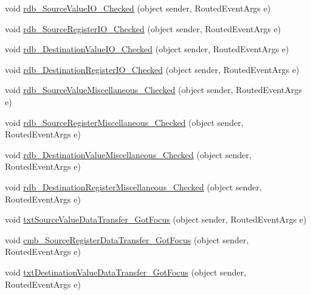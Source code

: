 \begin{DoxyCompactItemize}
\item 
void \hyperlink{class_c_p_u___o_s___simulator_1_1_instructions_window_aa84c68252386686704bfc50fc0013377}{rdb\+\_\+\+Source\+Value\+I\+O\+\_\+\+Checked} (object sender, Routed\+Event\+Args e)
\item 
void \hyperlink{class_c_p_u___o_s___simulator_1_1_instructions_window_a2bb662bda02027f69c3ac5eda1131bb5}{rdb\+\_\+\+Source\+Register\+I\+O\+\_\+\+Checked} (object sender, Routed\+Event\+Args e)
\item 
void \hyperlink{class_c_p_u___o_s___simulator_1_1_instructions_window_a6b3d3a23e92def88a459a22d3b020cf7}{rdb\+\_\+\+Destination\+Value\+I\+O\+\_\+\+Checked} (object sender, Routed\+Event\+Args e)
\item 
void \hyperlink{class_c_p_u___o_s___simulator_1_1_instructions_window_a7dd3bf48ece5f6e627be01710e7efed8}{rdb\+\_\+\+Destination\+Register\+I\+O\+\_\+\+Checked} (object sender, Routed\+Event\+Args e)
\item 
void \hyperlink{class_c_p_u___o_s___simulator_1_1_instructions_window_a245dad441fcbc7e910e7f2ab6d10563c}{rdb\+\_\+\+Source\+Value\+Miscellaneous\+\_\+\+Checked} (object sender, Routed\+Event\+Args e)
\item 
void \hyperlink{class_c_p_u___o_s___simulator_1_1_instructions_window_affbdaf2f0b660f1d0a96b06bb1d038d9}{rdb\+\_\+\+Source\+Register\+Miscellaneous\+\_\+\+Checked} (object sender, Routed\+Event\+Args e)
\item 
void \hyperlink{class_c_p_u___o_s___simulator_1_1_instructions_window_a71fc15afd802fb93c7991e437ef9fd19}{rdb\+\_\+\+Destination\+Value\+Miscellaneous\+\_\+\+Checked} (object sender, Routed\+Event\+Args e)
\item 
void \hyperlink{class_c_p_u___o_s___simulator_1_1_instructions_window_a1d014230db7d7462aba012a8d61cd2f3}{rdb\+\_\+\+Destination\+Register\+Miscellaneous\+\_\+\+Checked} (object sender, Routed\+Event\+Args e)
\item 
void \hyperlink{class_c_p_u___o_s___simulator_1_1_instructions_window_ab89dd8e5416a91477aad1faa02bcbacd}{txt\+Source\+Value\+Data\+Transfer\+\_\+\+Got\+Focus} (object sender, Routed\+Event\+Args e)
\item 
void \hyperlink{class_c_p_u___o_s___simulator_1_1_instructions_window_a3435ee12d0f01d5095fa3229b4d9c972}{cmb\+\_\+\+Source\+Register\+Data\+Transfer\+\_\+\+Got\+Focus} (object sender, Routed\+Event\+Args e)
\item 
void \hyperlink{class_c_p_u___o_s___simulator_1_1_instructions_window_a7d05b02bf62d6b920ebd1c2677e5a0dc}{txt\+Destination\+Value\+Data\+Transfer\+\_\+\+Got\+Focus} (object sender, Routed\+Event\+Args e)

\end{DoxyCompactItemize}
